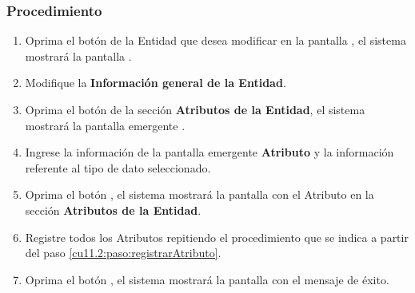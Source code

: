 \subsubsection{Procedimiento}
\begin{enumerate}
	\item Oprima el botón \btnEditar de la Entidad que desea modificar en la pantalla , el sistema mostrará la pantalla . 

	
	\item Modifique la \textbf{Información general de la Entidad}.
	
	\item Oprima el botón  de la sección \textbf{Atributos de la Entidad}, el sistema mostrará la pantalla emergente . \label{cu11.2:paso:registrarAtributo} 

	\item Ingrese la información de la pantalla emergente \textbf{Atributo} y la información referente al tipo de dato seleccionado.
	
	\item Oprima el botón , el sistema mostrará la pantalla  con el Atributo en la sección \textbf{Atributos de la Entidad}.
	
	\item Registre todos los Atributos repitiendo el procedimiento que se indica a partir del paso \ref{cu11.2:paso:registrarAtributo}.
	
	\item Oprima el botón , el sistema mostrará la pantalla  con el mensaje de éxito.
\end{enumerate}


